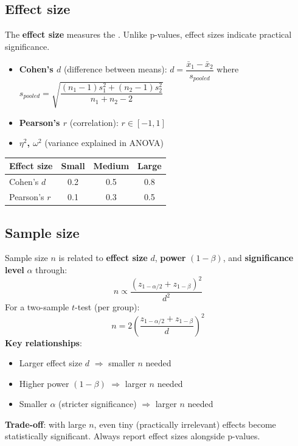 \subsection{Effect size}
The \textbf{effect size} measures the .
Unlike p-values, effect sizes indicate practical significance.
\begin{itemize}
    \item \textbf{Cohen's $d$} (difference between means):
        $d = \dfrac{\bar{x}_1 - \bar{x}_2}{s_{pooled}}$ where
        $s_{pooled} = \sqrt{\dfrac{(n_1-1)s_1^2 + (n_2-1)s_2^2}{n_1+n_2-2}}$
    \item \textbf{Pearson's $r$} (correlation): $r \in [-1, 1]$
    \item \textbf{$\eta^2$, $\omega^2$} (variance explained in ANOVA)
\end{itemize}
\begin{center}
\begin{tabular}{|l|c|c|c|}
    \hline
    \textbf{Effect size} & \textbf{Small} & \textbf{Medium} & \textbf{Large} \\
    \hline
    Cohen's $d$ & 0.2 & 0.5 & 0.8 \\
    Pearson's $r$ & 0.1 & 0.3 & 0.5 \\
    \hline
\end{tabular}
\end{center}

\subsection{Sample size}
Sample size $n$ is related to \textbf{effect size} $d$, \textbf{power} $(1-\beta)$, and
\textbf{significance level} $\alpha$ through:
$$n \propto \dfrac{(z_{1-\alpha/2} + z_{1-\beta})^2}{d^2}$$
For a two-sample $t$-test (per group):
$$n = 2\left(\dfrac{z_{1-\alpha/2} + z_{1-\beta}}{d}\right)^2$$
\textbf{Key relationships}:
\begin{itemize}
    \item Larger effect size $d$ $\Rightarrow$ smaller $n$ needed
    \item Higher power $(1-\beta)$ $\Rightarrow$ larger $n$ needed
    \item Smaller $\alpha$ (stricter significance) $\Rightarrow$ larger $n$ needed
\end{itemize}
\textbf{Trade-off}: with large $n$, even tiny (practically irrelevant) effects become
statistically significant. Always report effect sizes alongside p-values.


